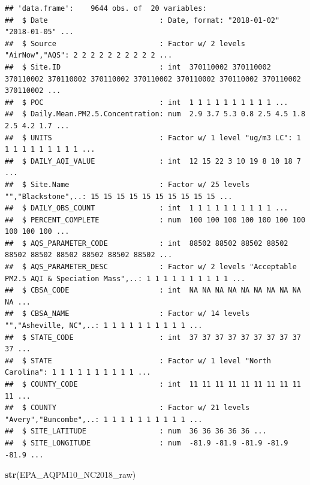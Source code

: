\documentclass[12pt,]{article}
\newenvironment{Shaded}{\begin{snugshade}}{\end{snugshade}}
\newcommand{\KeywordTok}[1]{\textcolor[rgb]{0.13,0.29,0.53}{\textbf{#1}}}
\newcommand{\NormalTok}[1]{#1}
\begin{document}
\begin{verbatim}
## 'data.frame':    9644 obs. of  20 variables:
##  $ Date                          : Date, format: "2018-01-02" "2018-01-05" ...
##  $ Source                        : Factor w/ 2 levels "AirNow","AQS": 2 2 2 2 2 2 2 2 2 2 ...
##  $ Site.ID                       : int  370110002 370110002 370110002 370110002 370110002 370110002 370110002 370110002 370110002 370110002 ...
##  $ POC                           : int  1 1 1 1 1 1 1 1 1 1 ...
##  $ Daily.Mean.PM2.5.Concentration: num  2.9 3.7 5.3 0.8 2.5 4.5 1.8 2.5 4.2 1.7 ...
##  $ UNITS                         : Factor w/ 1 level "ug/m3 LC": 1 1 1 1 1 1 1 1 1 1 ...
##  $ DAILY_AQI_VALUE               : int  12 15 22 3 10 19 8 10 18 7 ...
##  $ Site.Name                     : Factor w/ 25 levels "","Blackstone",..: 15 15 15 15 15 15 15 15 15 15 ...
##  $ DAILY_OBS_COUNT               : int  1 1 1 1 1 1 1 1 1 1 ...
##  $ PERCENT_COMPLETE              : num  100 100 100 100 100 100 100 100 100 100 ...
##  $ AQS_PARAMETER_CODE            : int  88502 88502 88502 88502 88502 88502 88502 88502 88502 88502 ...
##  $ AQS_PARAMETER_DESC            : Factor w/ 2 levels "Acceptable PM2.5 AQI & Speciation Mass",..: 1 1 1 1 1 1 1 1 1 1 ...
##  $ CBSA_CODE                     : int  NA NA NA NA NA NA NA NA NA NA ...
##  $ CBSA_NAME                     : Factor w/ 14 levels "","Asheville, NC",..: 1 1 1 1 1 1 1 1 1 1 ...
##  $ STATE_CODE                    : int  37 37 37 37 37 37 37 37 37 37 ...
##  $ STATE                         : Factor w/ 1 level "North Carolina": 1 1 1 1 1 1 1 1 1 1 ...
##  $ COUNTY_CODE                   : int  11 11 11 11 11 11 11 11 11 11 ...
##  $ COUNTY                        : Factor w/ 21 levels "Avery","Buncombe",..: 1 1 1 1 1 1 1 1 1 1 ...
##  $ SITE_LATITUDE                 : num  36 36 36 36 36 ...
##  $ SITE_LONGITUDE                : num  -81.9 -81.9 -81.9 -81.9 -81.9 ...
\end{verbatim}

\begin{Shaded}
\begin{Highlighting}[]
\KeywordTok{str}\NormalTok{(EPA_AQPM10_NC2018_raw)}
\end{Highlighting}
\end{Shaded}
\end{document}
